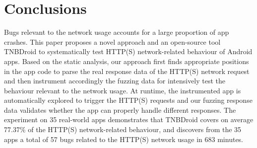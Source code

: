 \documentclass[sigconf,review, anonymous]{acmart}
\begin{document}
\section{Conclusions}\label{conclusion}
Bugs relevant to the network usage accounts for a large proportion of app crashes. 
This paper proposes a novel approach and an open-source tool \textsf{TNBDroid} to systematically test HTTP(S) network-related behaviour of Android apps. Based on the static analysis, our approach first finds appropriate positions in the app code to parse the real response data of the HTTP(S) network request and then instrument accordingly the fuzzing data for intensively test the behaviour relevant to the network usage. At runtime, the instrumented app is automatically explored to trigger the HTTP(S) requests and our fuzzing response data validates whether the app can properly handle different responses. The experiment on 35 real-world apps demonstrates that \textsf{TNBDroid} covers on average 77.37\% of the HTTP(S) network-related behaviour, and discovers from the 35 apps a total of 57 bugs related to the HTTP(S) network usage in 683 minutes.   

\newpage



\end{document}
